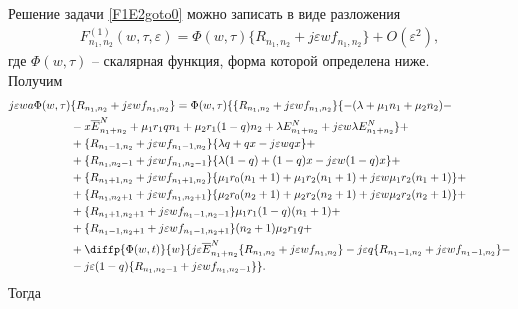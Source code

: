 Решение задачи \eqref{F1E2goto0} можно записать в виде разложения
\begin{align}\label{expansionF}
F_{n_{1}, n_{2}}^{(1)}(w,\tau,\varepsilon)=\Phi (w,\tau)\{R_{n_{1}, n_{2}}+j\varepsilon w f_{n_{1}, n_{2}}\}+O(\varepsilon^2),
\end{align}
где $\Phi (w,\tau)$ -- скалярная функция, форма которой определена ниже. \\
\hspace*{\parindent}%
Получим \\
 \begin{equation*}
	\begin{split}
		j\varepsilon wa \Phi (w,\tau)&\{R_{n_{1}, n_{2}}+j\varepsilon w f_{n_{1}, n_{2}}\}=
		\Phi (w,\tau)\{\{R_{n_{1}, n_{2}}+j\varepsilon w f_{n_{1}, n_{2}}\}\{-(\lambda+\mu_{1}n_{1}+\mu_{2}n_{2}) -\\
		&-x\overline{E}_{n_{1}+n_{2}}^N+\mu_{1}r_{1}q n_{1}+ \mu_{2}r_{1}(1-q)n_{2}+ \lambda E_{n_{1}+n_{2}}^N+
		j\varepsilon w \lambda E_{n_{1}+n_{2}}^N \}+\\
		&+\{R_{n_{1}-1, n_{2}}+j\varepsilon w f_{n_{1}-1, n_{2}}\}\{\lambda q+ q  x-j\varepsilon wq x\}+\\
		&+\{R_{n_{1}, n_{2}-1}+j\varepsilon w f_{n_{1}, n_{2}-1}\}\{\lambda (1-q)
		+ (1-q) x -j\varepsilon w(1-q) x \}+\\
		&+ \{R_{n_{1}+1, n_{2}}+j\varepsilon w f_{n_{1}+1, n_{2}}\}\{\mu_{1} r_{0}(n_{1}+1)
		+ \mu_{1} r_{2}(n_{1}+1)+j\varepsilon w\mu_{1} r_{2}(n_{1}+1)\}+\\
		&+ \{R_{n_{1}, n_{2}+1}+j\varepsilon w f_{n_{1}, n_{2}+1}\}\{\mu_{2} r_{0}(n_{2}+1)
		 + \mu_{2} r_{2} (n_{2}+1) +j\varepsilon w\mu_{2} r_{2} (n_{2}+1)\}+\\
		&+\{R_{n_{1}+1, n_{2}+1}+j\varepsilon w f_{n_{1}-1, n_{2}-1}\}\mu_{1} r_{1}(1-q)(n_{1}+1) +\\
		&+\{R_{n_{1}-1, n_{2}+1}+j\varepsilon w f_{n_{1}-1, n_{2}+1}\}(n_{2}+1)\mu_{2} r_{1}q  +\\
		&+ \diffp{\Phi(w,t)}{w}\{j\varepsilon \overline{E}_{n_{1}+n_{2}}^N\{R_{n_{1}, n_{2}}+j\varepsilon w f_{n_{1}, n_{2}}\}
		-  j\varepsilon q  \{R_{n_{1}-1, n_{2}}+j\varepsilon w f_{n_{1}-1, n_{2}}\}-\\
		&- j \varepsilon (1-q) \{R_{n_{1}, n_{2}-1}+j\varepsilon w f_{n_{1}, n_{2}-1}\}\}.
	\end{split}
\end{equation*}
Тогда
